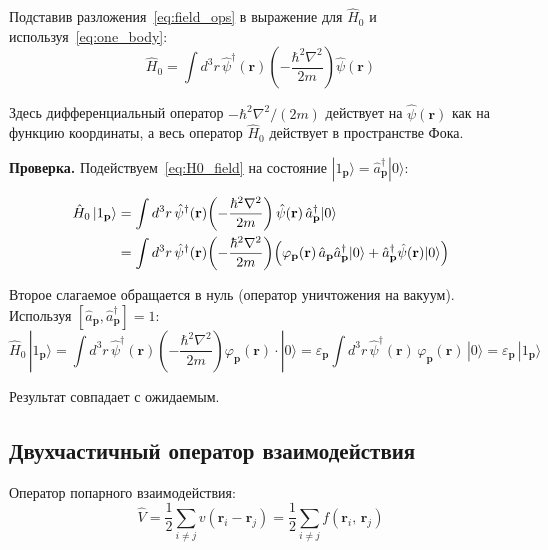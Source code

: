 \documentclass[../general/general]{subfiles}
\begin{document}
Подставив разложения~\eqref{eq:field_ops} в выражение для $\hat{H}_0$ и используя~\eqref{eq:one_body}:
\begin{equation}
    \hat{H}_0 = \int d^3r\,\hat{\psi}^\dagger(\mathbf{r})\!\left(-\frac{\hbar^2\nabla^2}{2m}\right)\hat{\psi}(\mathbf{r})
    \label{eq:H0_field}
\end{equation}

Здесь дифференциальный оператор $-\hbar^2\nabla^2/(2m)$ действует на $\hat{\psi}(\mathbf{r})$ как на функцию координаты, а весь оператор $\hat{H}_0$ действует в пространстве Фока.

\textbf{Проверка.} Подействуем~\eqref{eq:H0_field} на состояние $|1_\mathbf{p}\rangle = \hat{a}^\dagger_\mathbf{p}|0\rangle$:

\begin{align}
    \hat{H}_0\,|1_\mathbf{p}\rangle &= \int d^3r\,\hat{\psi}^\dagger(\mathbf{r})\!\left(-\frac{\hbar^2\nabla^2}{2m}\right)\hat{\psi}(\mathbf{r})\,\hat{a}^\dagger_\mathbf{p}|0\rangle \notag\\
    &= \int d^3r\,\hat{\psi}^\dagger(\mathbf{r})\!\left(-\frac{\hbar^2\nabla^2}{2m}\right)\!\left(\varphi_\mathbf{p}(\mathbf{r})\,\hat{a}_\mathbf{p}\hat{a}^\dagger_\mathbf{p}|0\rangle + \hat{a}^\dagger_\mathbf{p}\hat{\psi}(\mathbf{r})|0\rangle\right)
\end{align}

Второе слагаемое обращается в нуль (оператор уничтожения на вакуум). Используя $[\hat{a}_\mathbf{p},\hat{a}^\dagger_\mathbf{p}] = 1$:
\begin{equation}
    \hat{H}_0\,|1_\mathbf{p}\rangle = \int d^3r\,\hat{\psi}^\dagger(\mathbf{r})\!\left(-\frac{\hbar^2\nabla^2}{2m}\right)\varphi_\mathbf{p}(\mathbf{r})\cdot|0\rangle = \varepsilon_\mathbf{p}\int d^3r\,\hat{\psi}^\dagger(\mathbf{r})\,\varphi_\mathbf{p}(\mathbf{r})\,|0\rangle = \varepsilon_\mathbf{p}\,|1_\mathbf{p}\rangle
\end{equation}

Результат совпадает с ожидаемым.

\subsection{Двухчастичный оператор взаимодействия}

Оператор попарного взаимодействия:
\begin{equation}
    \hat{V} = \frac{1}{2}\sum_{i\neq j} v(\mathbf{r}_i - \mathbf{r}_j) = \frac{1}{2}\sum_{i\neq j} f(\mathbf{r}_i,\,\mathbf{r}_j)
\end{equation}
\end{document}
